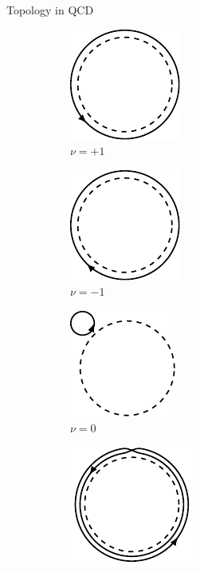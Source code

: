 \documentclass[10pt,show notes on second screen]{beamer}
\begin{document}
\begin{frame}{Topology in QCD}
\begin{block}
\begin{figure}[h!tb]
    \centering
    \begin{subfigure}{0.22\textwidth}
        \centering
        \includegraphics{../figures/illustrations/qcd/winding-number/winding-number1.pdf}
        \caption{$\nu=+1$}
    \end{subfigure}
    \begin{subfigure}{0.22\textwidth}
        \centering
        \includegraphics{../figures/illustrations/qcd/winding-number/winding-number-1.pdf}
        \caption{$\nu=-1$}
    \end{subfigure}
    \begin{subfigure}{0.22\textwidth}
        \centering
        \includegraphics{../figures/illustrations/qcd/winding-number/winding-number0.pdf}
        \caption{$\nu=0$}
    \end{subfigure}
    \begin{subfigure}{0.22\textwidth}
        \centering
        \includegraphics{../figures/illustrations/qcd/winding-number/winding-number+2.pdf}

\end{subfigure}
\end{figure}
\end{block}
\end{frame}
\end{document}
